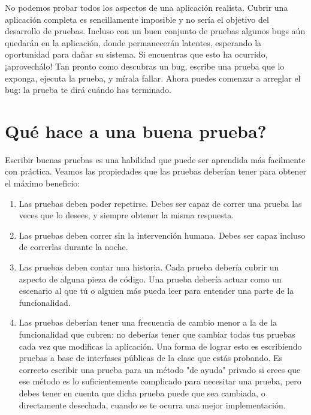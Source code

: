 \documentclass[a4paper,10pt,twoside]{book}
\begin{document}
No podemos probar todos los aspectos de una aplicaci\'on realista.
Cubrir una aplicaci\'on completa es sencillamente imposible y no ser\'ia el objetivo del desarrollo de pruebas.
Incluso con un buen conjunto de pruebas
algunos bugs a\'un quedar\'an en la aplicaci\'on, donde permanecer\'an latentes, esperando la oportunidad para da\~nar su sistema.
Si encuentras que esto ha ocurrido, ¡aprovech\'alo!
Tan pronto como descubras un bug, escribe una prueba que lo exponga, ejecuta la prueba, y m\'irala fallar.
Ahora puedes comenzar a arreglar el bug: la prueba te dir\'a cu\'ando has terminado.

\section{\¿Qu\'e hace a una buena prueba?}

Escribir buenas pruebas es una habilidad que puede ser aprendida m\'as facilmente con pr\'actica.
Veamos las propiedades que las pruebas deber\'ian tener para obtener el m\'aximo beneficio: 


\begin{enumerate}

\item Las pruebas deben poder repetirse. Debes ser capaz de correr una prueba
	las  veces que lo desees, y siempre obtener la misma respuesta.

\item Las pruebas deben correr sin la intervenci\'on humana. Debes ser capaz
	incluso de correrlas durante la noche.

\item Las pruebas deben contar una historia. Cada prueba deber\'ia cubrir un aspecto
	de alguna pieza de c\'odigo. Una prueba deber\'ia actuar como un escenario al que t\'u o alguien m\'as
	pueda leer para entender una parte de la funcionalidad. \label{prop:oneAspect}

\item Las pruebas deber\'ian tener una frecuencia de cambio menor
	a la de la funcionalidad que cubren: no deber\'ias tener que cambiar
	todas tus pruebas cada vez que modificas la aplicaci\'on.  Una forma de lograr
	esto es escribiendo pruebas a base de interfases p\'ublicas de la clase que
	est\'as probando.      
	Es correcto escribir una prueba para un m\'etodo "de ayuda" privado si crees que 
	ese m\'etodo es lo suficientemente complicado para necesitar una prueba, pero debes
	tener en cuenta que dicha prueba puede que sea cambiada, o directamente desechada,
	cuando se te ocurra una mejor implementaci\'on.
\end{enumerate}
\end{document}
